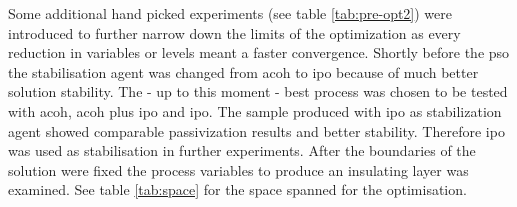 Some additional hand picked experiments (see table \ref{tab:pre-opt2}) were introduced to further narrow down the limits of 
the optimization as every reduction in variables or levels meant a faster convergence.
Shortly before the \gls{pso} the stabilisation agent was changed from \gls{acoh} to 
\gls{ipo} because of much better solution stability.
The - up to this moment - best process was chosen to be tested with 
 \gls{acoh},  \gls{acoh} plus  \gls{ipo} and  \gls{ipo}.
The sample produced with \gls{ipo} as stabilization agent 
showed comparable passivization results and better stability. 
Therefore \gls{ipo} was used  as stabilisation in further experiments.
After the boundaries of the solution were fixed 
the process variables to produce an insulating layer was examined. 
See table \ref{tab:space} for the space spanned for the optimisation.
